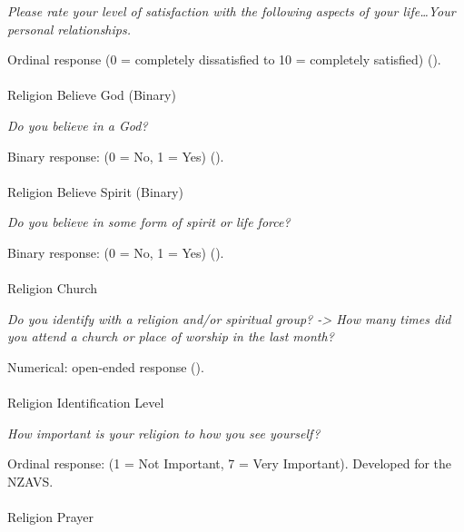 \documentclass[
  single column]{article}
\makeatletter
\let\oldparagraph\paragraph
\renewcommand{\paragraph}{
    \@ifstar
      \xxxParagraphStar
      \xxxParagraphNoStar
  }
\newcommand{\xxxParagraphStar}[1]{\oldparagraph*{#1}\mbox{}}
\newcommand{\xxxParagraphNoStar}[1]{\oldparagraph{#1}\mbox{}}
\makeatother
\begin{document}
\emph{Please rate your level of satisfaction with the following aspects
of your life\ldots Your personal relationships.}

Ordinal response (0 = completely dissatisfied to 10 = completely
satisfied) ().

\paragraph{Religion Believe God
(Binary)}\label{religion-believe-god-binary}

\emph{Do you believe in a God?}

Binary response: (0 = No, 1 = Yes)
().

\paragraph{Religion Believe Spirit
(Binary)}\label{religion-believe-spirit-binary}

\emph{Do you believe in some form of spirit or life force?}

Binary response: (0 = No, 1 = Yes)
().

\paragraph{Religion Church}\label{religion-church}

\emph{Do you identify with a religion and/or spiritual group?
-\textgreater{} How many times did you attend a church or place of
worship in the last month?}

Numerical: open-ended response ().

\paragraph{Religion Identification
Level}\label{religion-identification-level}

\emph{How important is your religion to how you see yourself?}

Ordinal response: (1 = Not Important, 7 = Very Important). Developed for
the NZAVS.

\paragraph{Religion Prayer}\label{religion-prayer}
\end{document}
